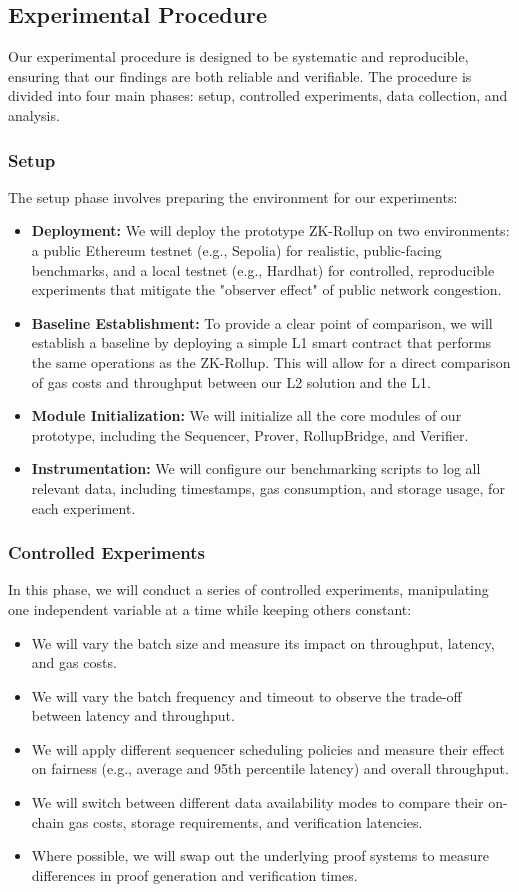 \subsection{Experimental Procedure}
Our experimental procedure is designed to be systematic and reproducible, ensuring that our findings are both reliable and verifiable. The procedure is divided into four main phases: setup, controlled experiments, data collection, and analysis.

\subsubsection{Setup}
The setup phase involves preparing the environment for our experiments:
\begin{itemize}
\item \textbf{Deployment:} We will deploy the prototype ZK-Rollup on two environments: a public Ethereum testnet (e.g., Sepolia) for realistic, public-facing benchmarks, and a local testnet (e.g., Hardhat) for controlled, reproducible experiments that mitigate the "observer effect" of public network congestion.
\item \textbf{Baseline Establishment:} To provide a clear point of comparison, we will establish a baseline by deploying a simple L1 smart contract that performs the same operations as the ZK-Rollup. This will allow for a direct comparison of gas costs and throughput between our L2 solution and the L1.
\item \textbf{Module Initialization:} We will initialize all the core modules of our prototype, including the Sequencer, Prover, RollupBridge, and Verifier.
\item \textbf{Instrumentation:} We will configure our benchmarking scripts to log all relevant data, including timestamps, gas consumption, and storage usage, for each experiment.
\end{itemize}

\subsubsection{Controlled Experiments}
In this phase, we will conduct a series of controlled experiments, manipulating one independent variable at a time while keeping others constant:
\begin{itemize}
\item We will vary the batch size and measure its impact on throughput, latency, and gas costs.
\item We will vary the batch frequency and timeout to observe the trade-off between latency and throughput.
\item We will apply different sequencer scheduling policies and measure their effect on fairness (e.g., average and 95th percentile latency) and overall throughput.
\item We will switch between different data availability modes to compare their on-chain gas costs, storage requirements, and verification latencies.
\item Where possible, we will swap out the underlying proof systems to measure differences in proof generation and verification times.
\end{itemize}

